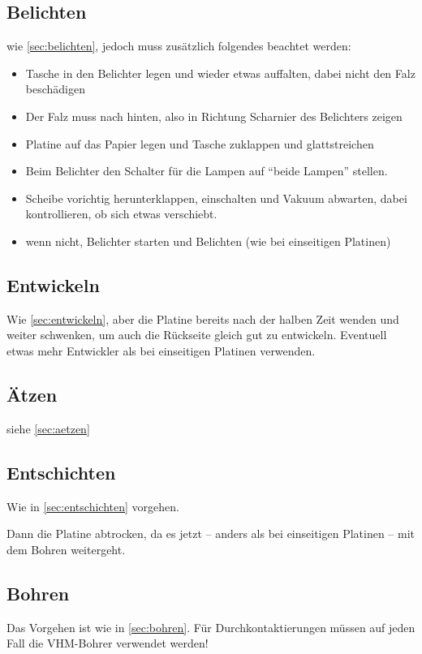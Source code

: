 \documentclass{\basedir/fablab-document}
\begin{document}
\subsection{Belichten}
wie \ref{sec:belichten}, jedoch muss zusätzlich folgendes beachtet werden:

\begin{itemize}
\item Tasche in den Belichter legen und wieder etwas auffalten, dabei nicht den Falz beschädigen
\item Der Falz muss nach hinten, also in Richtung Scharnier des Belichters zeigen
\item Platine auf das Papier legen und Tasche zuklappen und glattstreichen
\item Beim Belichter den Schalter für die Lampen auf ``beide Lampen'' stellen.
\item Scheibe vorichtig herunterklappen, einschalten und Vakuum abwarten, dabei kontrollieren, ob sich etwas verschiebt.
\item wenn nicht, Belichter starten und Belichten (wie bei einseitigen Platinen)
\end{itemize}

\subsection{Entwickeln}
Wie \ref{sec:entwickeln}, aber die Platine bereits nach der halben Zeit wenden und weiter schwenken, um auch die Rückseite gleich gut zu entwickeln. Eventuell etwas mehr Entwickler als bei einseitigen Platinen verwenden.

\subsection{Ätzen}
siehe \ref{sec:aetzen}

\subsection{Entschichten}
Wie in \ref{sec:entschichten} vorgehen.

Dann die Platine abtrocken, da es jetzt -- anders als bei einseitigen Platinen -- mit dem Bohren weitergeht.

\subsection{Bohren}
Das Vorgehen ist wie in \ref{sec:bohren}. Für Durchkontaktierungen müssen auf jeden Fall die VHM-Bohrer verwendet werden!
\end{document}
